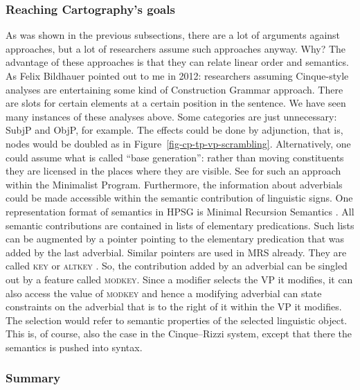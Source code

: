 \subsubsection{Reaching Cartography's goals}
\label{sec-Cinque-solution}

As was shown in the previous subsections, there are a lot of arguments against
\citeauthor{CR2010a} approaches, but a lot of researchers assume such approaches anyway. Why? The
advantage of these approaches is that they can relate linear order and semantics. As Felix Bildhauer
pointed out to me in 2012: researchers assuming Cinque-style analyses are entertaining some kind of Construction Grammar
approach. There are slots for certain elements at a certain position in the sentence. We have seen
many instances of these analyses above. Some categories are just unnecessary: SubjP and ObjP, for
example. The effects could be done by adjunction, that is, nodes would be doubled as in
Figure~\ref{fig-cp-tp-vp-scrambling}. Alternatively, one could assume what is called ``base
generation'': rather than moving constituents they are licensed in the places where they are visible. See
\citet{Fanselow2001a} for such an approach within the Minimalist Program.
Furthermore, the information about adverbials could be made accessible
within the semantic contribution of linguistic signs. One representation format of semantics in HPSG
is Minimal Recursion Semantics \citep{CFPS2005a}. All semantic contributions are contained in lists of elementary
predications. Such lists can be augmented by a pointer pointing to the elementary predication that
was added by the last adverbial. Similar pointers are used in MRS already. They are called
\textsc{key} or \textsc{altkey} \parencites[Section~3.7]{FBO2003a-u}[]{CFPS2005a}. So, the contribution added by an adverbial can be singled out by a
feature called \textsc{modkey}. Since a modifier selects the VP it modifies, it can also access the value of \textsc{modkey} and hence a
modifying adverbial can state constraints on the adverbial that is to the right of it within the VP
it modifies. The selection would refer to semantic properties of the selected linguistic
object. This is, of course, also the case in the Cinque–Rizzi system, except that there the
semantics is pushed into syntax.%

\subsubsection{Summary}


